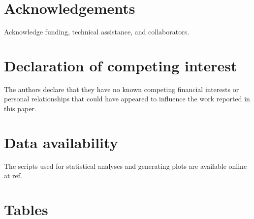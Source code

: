 \documentclass[preprint,12pt]{elsarticle}
\begin{document}

\section*{Acknowledgements}

Acknowledge funding, technical assistance, and collaborators.


\section*{Declaration of competing interest}

The authors declare that they have no known competing
financial interests or personal relationships that could
have appeared to influence the work reported in this paper.

\section*{Data availability}

The scripts used for statistical analyses and generating plots are available online at ref.

\clearpage
\section*{Tables}
\end{document}
